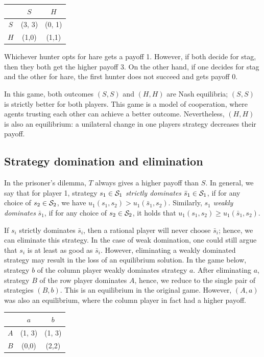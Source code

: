 \documentclass[12pt, showidx, twoside]{article}
\begin{document}
{{{\begin{center}
\begin{tabular}{c|cc|}
 ~  & $S$ & $H$ \\ \hline
$S$ & (3, 3) & (0, 1) \\
$H$ & (1,0) & (1,1) \\
\hline
\end{tabular}
\end{center}

Whichever hunter opts for hare gets a payoff 1. However, if both decide for stag, then they both get the higher payoff 3. On the other hand, if one decides for stag and the other for hare, the first hunter does not succeed and gets payoff 0.

In this game, both outcomes $(S,S)$ and $(H,H)$ are Nash equilibria; $(S,S)$ is strictly better for both players. This game is a model of cooperation, where agents trusting each other can achieve a better outcome. Nevertheless, $(H,H)$ is also an equilibrium: a unilateral change in one players strategy decreases their payoff.

\subsection{Strategy domination and elimination}
In the prisoner's dilemma, $T$ always gives a higher payoff than $S$. In general, we say that for player 1, strategy $s_1\in {\cal S}_1$ \emph{strictly dominates} $\bar s_1\in {\cal S}_1$, if for any choice of $s_2\in {\cal S}_2$, we have $u_1(s_1,s_2)>u_1(\bar s_1,s_2)$. Similarly, $s_1$ \emph{weakly dominates} $\bar s_1$, if for any choice of $s_2\in {\cal S}_2$, it holds that $u_1(s_1,s_2)\ge u_1(\bar s_1,s_2)$. 

If $s_i$ strictly dominates $\bar s_i$, then a rational player will never choose $\bar s_i$; hence, we can eliminate this strategy. In the case of weak domination, one could still argue that $s_i$ is at least as good as $\bar s_i$. However, eliminating a weakly dominated strategy may result in the loss of an equilibrium solution. In the game below, strategy $b$ of the column player weakly dominates strategy $a$. After eliminating $a$, strategy $B$ of the row player dominates $A$, hence, we reduce to the single pair of strategies $(B,b)$. This is an equilibrium in the original game. However, $(A,a)$ was also an equilibrium, where the column player in fact had a higher payoff.


\begin{center}
\begin{tabular}{c|cc|}
 ~  & $a$ & $b$ \\ \hline
$A$ & (1, 3) & (1, 3) \\
$B$ & (0,0) & (2,2) \\
\hline
\end{tabular}
\end{center}

}}}
\end{document}

